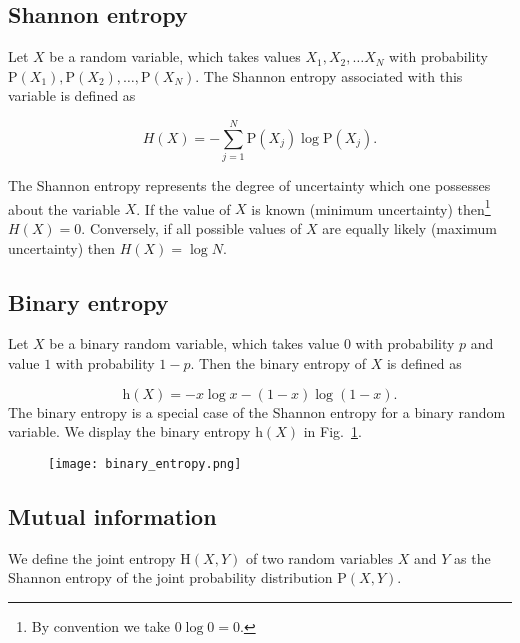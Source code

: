 \FloatBarrier
\subsection{Shannon entropy}
Let $X$ be a random variable, which takes values $X_1, X_2, \dots X_N$ with probability $\text{P}\left(X_1\right), \text{P}\left(X_2\right),\dots,\text{P}\left(X_N\right)$. The Shannon entropy associated with this variable is defined as 

\begin{equation}
H\left(X\right) = - \sum_{j=1}^N \text{P}\left(X_j\right) \log \text{P}\left(X_j\right).
\end{equation}

\noindent The Shannon entropy represents the degree of uncertainty which one possesses about the variable $X$. If the value of $X$ is known (minimum uncertainty) then\footnote{By convention we take $0 \log 0 = 0$.} $H\left(X\right) = 0$. Conversely, if all possible values of $X$ are equally likely (maximum uncertainty) then $H\left(X\right) = \log N$.

\FloatBarrier
\subsection{Binary entropy}
Let $X$ be a binary random variable, which takes value $0$ with probability $p$ and value $1$ with probability $1-p$. Then the binary entropy of $X$ is defined as

\begin{equation}
\text{h}\left(X\right) = - x \log x - \left(1-x\right) \log \left(1-x\right).
\end{equation}
The binary entropy is a special case of the Shannon entropy for a binary random variable. We display the binary entropy $\text{h}\left(X\right)$ in Fig.~\ref{fig:binary_entropy}.

\begin{figure}
\centering
\texttt{[image: binary\_entropy.png]}
\caption{\label{fig:binary_entropy}}
\end{figure}


\FloatBarrier
\subsection{Mutual information}
We define the joint entropy $\text{H}\left(X, Y\right)$ of two random variables $X$ and $Y$ as the Shannon entropy of the joint probability distribution $\text{P}\left(X, Y\right)$. 

